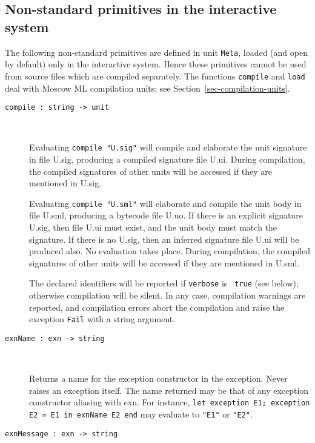 \documentclass[fleqn]{article}
\begin{document}
\subsection{Non-standard primitives in the interactive system}
\label{sec-nonstandard-interactive}

The following non-standard primitives are defined in unit {\tt Meta},
loaded (and open by default) only in the interactive system.  Hence
these primitives cannot be used from source files which are compiled
separately.  The functions {\tt compile} and {\tt load} deal with
Moscow ML compilation units; see Section~\ref{sec-compilation-units}.

\begin{description}

\item[{\tt compile :\ string -> unit}]\mbox{ }

  Evaluating {\tt compile "{\rm U.sig}"} will compile and elaborate
  the unit signature in file U.sig, producing a compiled signature
  file U.ui.  During compilation, the compiled signatures of other
  units will be accessed if they are mentioned in U.sig.

  Evaluating {\tt compile "{\rm U.sml}"} will elaborate and compile
  the unit body in file U.sml, producing a bytecode file U.uo.  If
  there is an explicit signature U.sig, then file U.ui must exist, and
  the unit body must match the signature.  If there is no U.sig, then
  an inferred signature file U.ui will be produced also.  No
  evaluation takes place.  During compilation, the compiled signatures
  of other units will be accessed if they are mentioned in U.sml.

  The declared identifiers will be reported if {\tt verbose} is {\tt
    true} (see below); otherwise compilation will be silent.  In any
    case, compilation warnings are reported, and compilation errors
    abort the compilation and raise the exception {\tt Fail} with a
    string argument.

\item[{\tt exnName :\ exn -> string}]\mbox{ }

  Returns a name for the exception constructor in the exception.
  Never raises an exception itself.  The name returned may be that of
  any exception constructor aliasing with exn.  For instance,   {\tt let
  exception E1; exception E2 = E1 in exnName E2 end} may evaluate to
  {\tt "E1"} or {\tt "E2"}.

\item[{\tt exnMessage :\ exn -> string}]\mbox{ }


\end{description}
\end{document}
